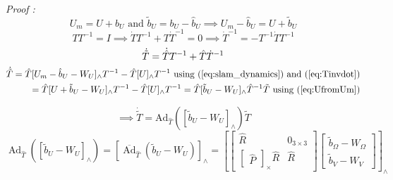 \documentclass[12pt]{article}
\begin{document}
\textit{Proof :} 
\begin{equation} \label{eq:UfromUm}
    U_m = U + b_U \text{ and } \tilde{b}_U = b_U - \hat b_U \implies U_m - \hat b_U = U + \tilde{b}_U
\end{equation}
\begin{equation} \label{eq:Tinvdot}
    TT^{-1} = I \implies \dot T T^{-1} + T \dot T^{-1} = 0 \implies \dot T^{-1} = -T^{-1} \dot T T^{-1}
\end{equation}
\begin{equation}
    \dot {\tilde{T}} = \dot{\hat T}T^{-1} + \hat T \dot{T}^{-1}   \\
\end{equation}
\begin{eqnarray}
    \dot {\tilde{T}} = \hat{T} [U_m - \hat b_U -W_U]_\wedge T^{-1} - \hat T [U]_\wedge T^{-1} \text{ using } (\ref{eq:slam_dynamics}) \text{ and } (\ref{eq:Tinvdot}) \nonumber \\
    = \hat{T} [U + \tilde b_U -W_U]_\wedge T^{-1} - \hat T [U]_\wedge T^{-1} =  \hat T [\tilde b_U - W_U]_\wedge \hat T^{-1}\tilde T\text{ using } (\ref{eq:UfromUm})
\end{eqnarray}

\begin{equation*}
    \implies \dot{\tilde T} = \text{Ad}_{\hat T}([\tilde b_U -W_U]_\wedge )\tilde T
\end{equation*}
\begin{equation*}
    \operatorname{Ad}_{\hat{{T}}}\left(\left[\tilde{b}_{U}-W_{U}\right]_{\wedge}\right)  =\left[\overline{\operatorname{Ad}}_{\hat{{T}}}\left(\tilde{b}_{U}-W_{U}\right)\right]_{\wedge} 
     =\left[\left[\begin{array}{cc}
    \hat{R} & 0_{3 \times 3} \\
    \begin{bmatrix}\hat{P}\end{bmatrix}_{\times} \hat{R} & \hat{R}
    \end{array}\right]\left[\begin{array}{c}
    \tilde{b}_{\Omega}-W_{\Omega} \\
    \tilde{b}_{V}-W_{V}
    \end{array}\right]\right]_{\wedge}
\end{equation*}
\end{document}
